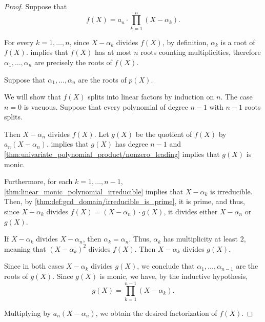 \begin{proof}
  \SufficiencySubProof Suppose that
  \begin{equation*}
    f(X) = a_n \cdot \prod_{k=1}^n (X - \alpha_k).
  \end{equation*}

  For every \( k = 1, \ldots, n \), since \( X - \alpha_k \) divides \( f(X) \), by definition, \( \alpha_k \) is a root of \( f(X) \).  implies that \( f(X) \) has at most \( n \) roots counting multiplicities, therefore \( \alpha_1, \ldots, \alpha_n \) are precisely the roots of \( f(X) \).

  \NecessitySubProof Suppose that \( \alpha_1, \ldots, \alpha_n \) are the roots of \( p(X) \).

  We will show that \( f(X) \) splits into linear factors by induction on \( n \). The case \( n = 0 \) is vacuous. Suppose that every polynomial of degree \( n - 1 \) with \( n - 1 \) roots splits.

  Then \( X - \alpha_n \) divides \( f(X) \). Let \( g(X) \) be the quotient of \( f(X) \) by \( a_n (X - \alpha_n) \).  implies that \( g(X) \) has degree \( n - 1 \) and \cref{thm:univariate_polynomial_product/nonzero_leading} implies that \( g(X) \) is monic.

  Furthermore, for each \( k = 1, \ldots, n - 1 \), \cref{thm:linear_monic_polynomial_irreducible} implies that \( X - \alpha_k \) is irreducible. Then, by \cref{thm:def:gcd_domain/irreducible_is_prime}, it is prime, and thus, since \( X - \alpha_k \) divides \( f(X) = (X - \alpha_n) \cdot g(X) \), it divides either \( X - \alpha_n \) or \( g(X) \).

  If \( X - \alpha_k \) divides \( X - \alpha_n \), then \( \alpha_k = \alpha_n \). Thus, \( \alpha_k \) has multiplicity at least \( 2 \), meaning that \( (X - \alpha_k)^2 \) divides \( f(X) \). Then \( X - \alpha_k \) divides \( g(X) \).

  Since in both cases \( X - \alpha_k \) divides \( g(X) \), we conclude that \( \alpha_1, \ldots, \alpha_{n-1} \) are the roots of \( g(X) \). Since \( g(X) \) is monic, we have, by the inductive hypothesis,
  \begin{equation*}
    g(X) = \prod_{k=1}^{n-1} (X - \alpha_k).
  \end{equation*}

  Multiplying by \( a_n (X - \alpha_n) \), we obtain the desired factorization of \( f(X) \).
\end{proof}


